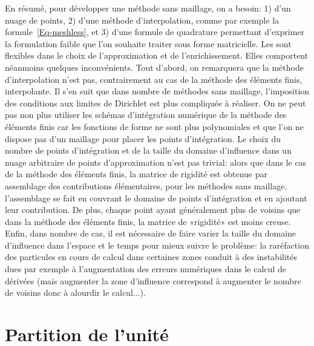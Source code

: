\medskip
En résumé, pour développer une méthode sans maillage, on a besoin: 1) d'un nuage de points, 2) d'une méthode d'interpolation, comme par exemple la formule~\ref{Eq-meshless}, et 3) d'une formule de quadrature permettant d'exprimer la formulation faible que l'on souhaite traiter sous forme matricielle.
Les  sont flexibles dans le choix de l'approximation et de l'enrichissement. Elles comportent néanmoins quelques inconvénients.
Tout d'abord, on remarquera que la méthode d'interpolation n'est pas, contrairement au cas de la méthode des éléments finis, interpolante. Il s'en suit que dans nombre de méthodes sans maillage, l'imposition des conditions aux limites de Dirichlet est plus compliquée à réaliser.
On ne peut pas non plus utiliser les schémas d'intégration numérique de la méthode des éléments finis car les fonctions de forme ne sont plus polynomiales et que l'on ne dispose pas d'un maillage pour placer les points d'intégration. Le choix du nombre de points d'intégration et de la taille du domaine d'influence dans un nuage arbitraire de points d'approximation n'est pas trivial: alors que dans le cas de la méthode des éléments finis, la matrice de rigidité est obtenue par assemblage des contributions élémentaires, pour les méthodes sans maillage, l'assemblage se fait en couvrant le domaine de points d'intégration et en ajoutant leur contribution. De plus, chaque point ayant généralement plus de voisins que dans la méthode des éléments finis, la matrice de «rigidité» est moins creuse. Enfin, dans nombre de cas, il est nécessaire de faire varier la taille du domaine d'influence dans l'espace et le temps pour mieux suivre le problème: la raréfaction des particules en cours de calcul dans certaines zones conduit à des instabilités dues par exemple à l'augmentation des erreurs numériques dans le calcul de dérivées (mais augmenter la zone d'influence correspond à augmenter le nombre de voisins donc à alourdir le calcul...).

\medskip
\section{Partition de l'unité}\label{Sec-partition}

